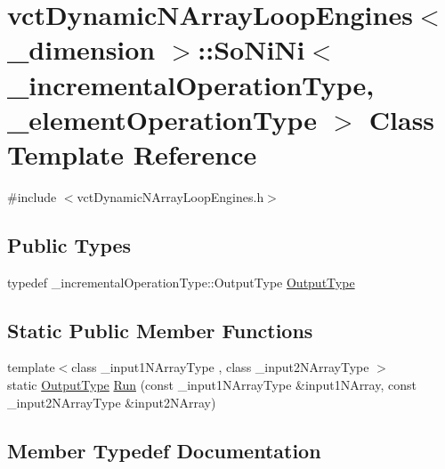 \hypertarget{classvct_dynamic_n_array_loop_engines_1_1_so_ni_ni}{}\section{vct\+Dynamic\+N\+Array\+Loop\+Engines$<$ \+\_\+dimension $>$\+:\+:So\+Ni\+Ni$<$ \+\_\+incremental\+Operation\+Type, \+\_\+element\+Operation\+Type $>$ Class Template Reference}
\label{classvct_dynamic_n_array_loop_engines_1_1_so_ni_ni}


{\ttfamily \#include $<$vct\+Dynamic\+N\+Array\+Loop\+Engines.\+h$>$}

\subsection*{Public Types}
\begin{DoxyCompactItemize}
\item 
typedef \+\_\+incremental\+Operation\+Type\+::\+Output\+Type \hyperlink{classvct_dynamic_n_array_loop_engines_1_1_so_ni_ni_aa6e920178bd3513b4b3c325f8e901399}{Output\+Type}
\end{DoxyCompactItemize}
\subsection*{Static Public Member Functions}
\begin{DoxyCompactItemize}
\item 
{\footnotesize template$<$class \+\_\+input1\+N\+Array\+Type , class \+\_\+input2\+N\+Array\+Type $>$ }\\static \hyperlink{classvct_dynamic_n_array_loop_engines_1_1_so_ni_ni_aa6e920178bd3513b4b3c325f8e901399}{Output\+Type} \hyperlink{classvct_dynamic_n_array_loop_engines_1_1_so_ni_ni_a0124b2542b58ea4aed6951388a5f372b}{Run} (const \+\_\+input1\+N\+Array\+Type \&input1\+N\+Array, const \+\_\+input2\+N\+Array\+Type \&input2\+N\+Array)
\end{DoxyCompactItemize}


\subsection{Member Typedef Documentation}
\hypertarget{classvct_dynamic_n_array_loop_engines_1_1_so_ni_ni_aa6e920178bd3513b4b3c325f8e901399}{}

